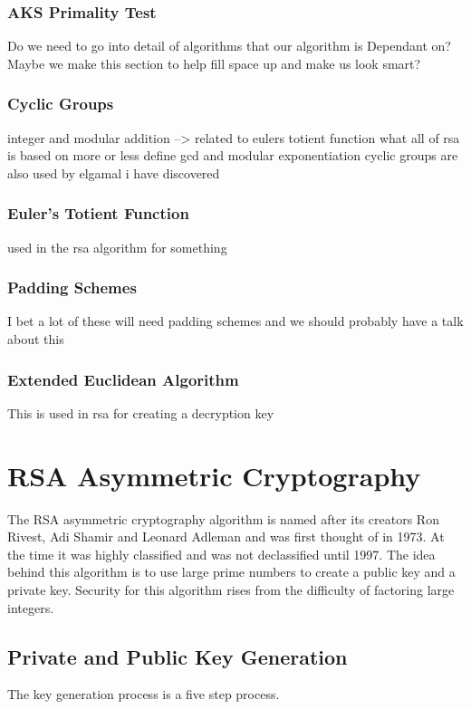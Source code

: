 \documentclass[conference]{IEEEtran}
\begin{document}
\subsubsection{AKS Primality Test}
Do we need to go into detail of algorithms that our algorithm is Dependant on?
Maybe we make this section to help fill space up and make us look smart?

\subsubsection{Cyclic Groups}
integer and modular addition --> related to eulers totient function
what all of rsa is based on more or less
define gcd and modular exponentiation
\newline
cyclic groups are also used by elgamal i have discovered

\subsubsection{Euler's Totient Function}
used in the rsa algorithm for something

\subsubsection{Padding Schemes}
I bet a lot of these will need padding schemes and we should probably have a talk about this


\subsubsection{Extended Euclidean Algorithm}
This is used in rsa for creating a decryption key

\color{black}


\section{RSA Asymmetric Cryptography}


The RSA asymmetric cryptography algorithm is named after its creators Ron Rivest, Adi Shamir and Leonard Adleman and was first thought of in 1973. 
At the time it was highly classified and was not declassified until 1997.
The idea behind this algorithm is to use large prime numbers to create a public key and a private key. 
Security for this algorithm rises from the difficulty of factoring large integers.
 
\subsection{Private and Public Key Generation}
The key generation process is a five step process. 
\end{document}
